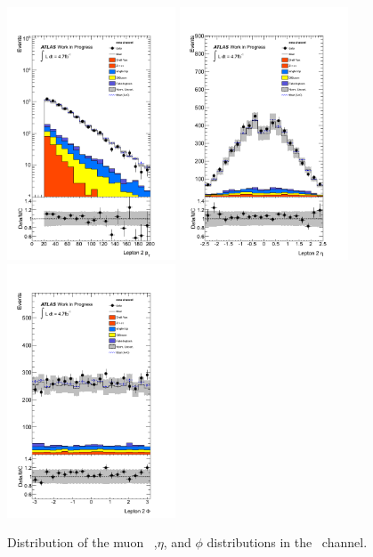 \begin{figure}[htbp!]
     \begin{center}
     \includegraphics[width=50mm]{f/emu_lep2_pt_central_double}
     \includegraphics[width=50mm]{f/emu_lep2_eta_central_double}
     \includegraphics[width=50mm]{f/emu_lep2_phi_central_double}
     \end{center}
     \caption{Distribution of the muon \pt\ ,$\eta$, and $\phi$ distributions in the \emu\ channel.}
     \label{fig:dilep_lep2_emu}
    \end{figure}

